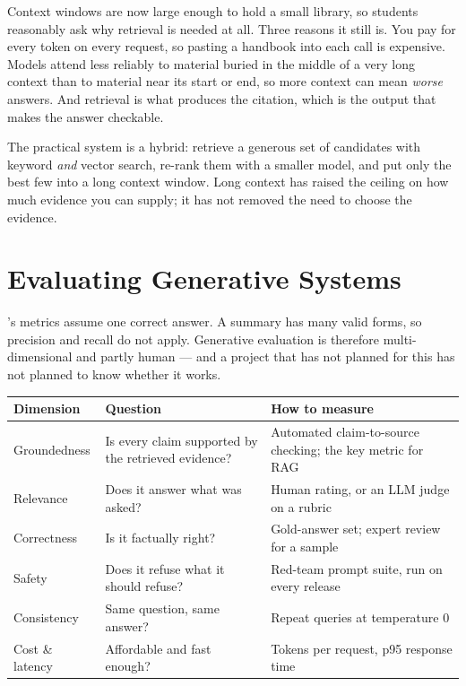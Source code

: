 \begin{conceptbox}
Context windows are now large enough to hold a small library, so students
reasonably ask why retrieval is needed at all. Three reasons it still is. You pay
for every token on every request, so pasting a handbook into each call is
expensive. Models attend less reliably to material buried in the middle of a very
long context than to material near its start or end, so more context can mean
\emph{worse} answers. And retrieval is what produces the citation, which is the
output that makes the answer checkable.

The practical system is a hybrid: retrieve a generous set of candidates with
keyword \emph{and} vector search, re-rank them with a smaller model, and put only
the best few into a long context window. Long context has raised the ceiling on how
much evidence you can supply; it has not removed the need to choose the evidence.
\end{conceptbox}

\section{Evaluating Generative Systems}

\begin{alertbox}
's metrics assume one correct answer. A summary has many valid
forms, so precision and recall do not apply. Generative evaluation is therefore
multi-dimensional and partly human --- and a project that has not planned for this
has not planned to know whether it works.
\end{alertbox}

\begin{longtable}{@{}L{2.9cm}L{4.6cm}L{6.6cm}@{}}
\toprule
{}
\textbf{Dimension} & \textbf{Question} & \textbf{How to measure} \\
\midrule
\endhead
Groundedness & Is every claim supported by the retrieved evidence? & Automated claim-to-source checking; the key metric for RAG \\
Relevance & Does it answer what was asked? & Human rating, or an LLM judge on a rubric \\
Correctness & Is it factually right? & Gold-answer set; expert review for a sample \\
Safety & Does it refuse what it should refuse? & Red-team prompt suite, run on every release \\
Consistency & Same question, same answer? & Repeat queries at temperature 0 \\
Cost \& latency & Affordable and fast enough? & Tokens per request, p95 response time \\
\bottomrule
\end{longtable}


